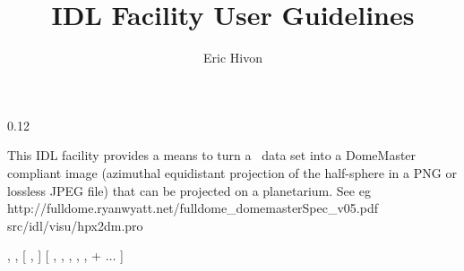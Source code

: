 
\sloppy

\title{\healpix IDL Facility User Guidelines}
 \section[hpx2dm]{ }
\label{idl:\thedocid}
\author{Eric Hivon}

  \newenvironment{qualifiers_hpx2dm}
    {\rule{\hsize}{0.7mm}
     \textsc{\Large{\textbf{QUALIFIERS}}}\hfill\newline%
	\renewcommand{\arraystretch}{1.5}%
	}

\newcommand{\sizeoneg}{0.12\hsize}
\newcommand{\sizethrg}{0.85\hsize}

\begin{facility}
{This IDL facility provides a means to turn a \healpix\ data set
into a DomeMaster
compliant image (azimuthal equidistant projection of the half-sphere
in a PNG or lossless JPEG file) that can be projected on a planetarium.
See eg 
%
{http://fulldome.ryanwyatt.net/fulldome_domemasterSpec_v05.pdf}
}
{src/idl/visu/hpx2dm.pro}
\end{facility}

\begin{IDLformat}
{\thedocid, 
, 
[ , ]
[ , 
, 
, 
, 
, 
%
  + %
%
$\ldots$
]
}
\end{IDLformat}

